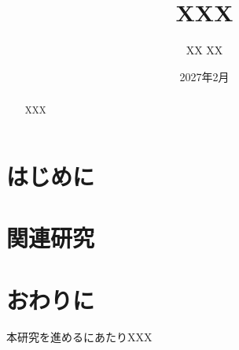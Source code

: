 \documentclass[11pt]{jreport}
\title{XXX}
\author{XX XX}
\date{2027年2月}
\begin{document}
\maketitle

\begin{abstract}
XXX
\end{abstract}

\tableofcontents



\newpage
{}


\chapter{はじめに}


\chapter{関連研究}\label{chap:background}


\chapter{おわりに}\label{chap:end}



\begin{acknowledgements}

本研究を進めるにあたりXXX
\end{acknowledgements}




\end{document}
